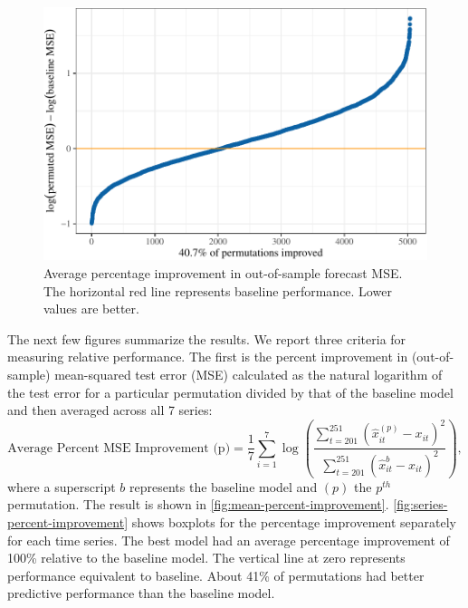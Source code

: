\documentclass[11pt]{article}
\renewcommand{\hat}{\widehat}
\begin{document}
\begin{figure}[t]

{\centering \includegraphics{gfx/mean-percent-improvement-1} 

}

\caption{Average percentage improvement in out-of-sample forecast MSE. The horizontal red line represents baseline performance. Lower values are better.}\label{fig:mean-percent-improvement}
\end{figure}

The next few figures summarize the results. We report three criteria for
measuring relative performance. The first is the percent improvement in
(out-of-sample) mean-squared test error (MSE) calculated as the natural
logarithm of the test error for a particular permutation divided by that
of the baseline model and then averaged across all 7 series:
\begin{equation}
  \mbox{Average Percent MSE Improvement (p)} = \frac{1}{7} \sum_{i=1}^7 \log
  \left(\frac{\sum_{t=201}^{251} (\hat{x}_{it}^{(p)}-x_{it})^2}
    {\sum_{t=201}^{251} (\hat{x}_{it}^{b}-x_{it})^2}\right),
\end{equation} where a superscript \(b\) represents the baseline model
and \((p)\) the \(p^{th}\) permutation. The result is shown in
\autoref{fig:mean-percent-improvement}.
\autoref{fig:series-percent-improvement} shows boxplots for the
percentage improvement separately for each time series. The best model
had an average percentage improvement of 100\% relative to the baseline
model. The vertical line at zero represents performance equivalent to
baseline. About 41\% of permutations had better predictive performance
than the baseline model.
\end{document}
